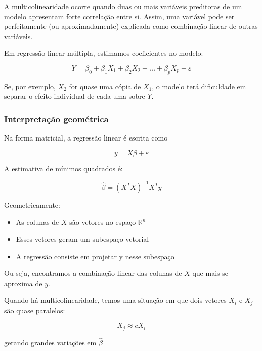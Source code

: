 \documentclass{article}
\begin{document}
A multicolinearidade ocorre quando duas ou mais variáveis preditoras de um modelo
apresentam forte correlação entre si. Assim, uma variável pode ser perfeitamente 
(ou aproximadamente) explicada como combinação linear de outras variáveis.

Em regressão linear múltipla, estimamos coeficientes no modelo:

\begin{equation*}
    Y = \beta_0 + \beta_1X_1 + \beta_2X_2 + ... + \beta_pX_p + \varepsilon
\end{equation*}

Se, por exemplo, $X_2$ for quase uma cópia de $X_1$, o modelo terá dificuldade
em separar o efeito individual de cada uma sobre $Y$.

\subsubsection{Interpretação geométrica}

Na forma matricial, a regressão linear é escrita como

\begin{equation*}
    y = X\beta + \varepsilon
\end{equation*}

A estimativa de mínimos quadrados é:

\begin{equation*}
    \hat{\beta} = (X^{T}X)^{-1}X^{T}y
\end{equation*}

Geometricamente:

\begin{itemize}
    \item As colunas de $X$ são vetores no espaço $\mathbb{R}^{n}$
    \item Esses vetores geram um subespaço vetorial
    \item A regressão consiste em projetar y nesse subespaço
\end{itemize}

Ou seja, encontramos a combinação linear das colunas de $X$ que mais 
se aproxima de $y$.

Quando há multicolinearidade, temos uma situação em que dois vetores 
$X_i$ e $X_j$ são quase paralelos:

\begin{equation*}
    X_j \approx cX_i
\end{equation*}

gerando grandes variações em $\hat{\beta}$
\end{document}
